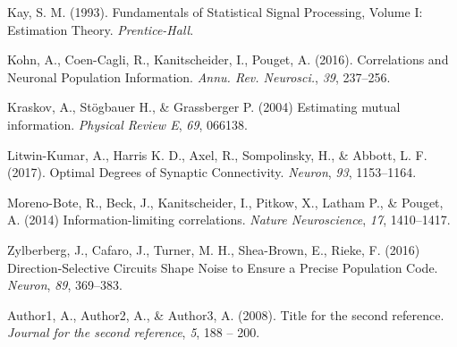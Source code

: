 \documentclass[12pt]{article}
\begin{document}
\begin{thebibliography}{100}
Kay, S. M. (1993).
\newblock Fundamentals of Statistical Signal Processing, Volume I: Estimation Theory.
\newblock \emph{Prentice-Hall}.

Kohn, A., Coen-Cagli, R., Kanitscheider, I., Pouget, A. (2016).
\newblock Correlations and Neuronal Population Information.
\newblock \emph{Annu. Rev. Neurosci.}, \emph{39}, 237--256.

Kraskov, A., St{\"o}gbauer H., \& Grassberger P. (2004)
\newblock Estimating mutual information.
\newblock \emph{Physical Review E},
\emph{69}, 066138.

Litwin-Kumar, A., Harris K. D., Axel, R., Sompolinsky, H., \& Abbott, L. F. (2017).
\newblock Optimal Degrees of Synaptic Connectivity.
\newblock \emph{Neuron}, \emph{93}, 1153--1164.

Moreno-Bote, R., Beck, J., Kanitscheider, I., Pitkow, X., Latham P., \& Pouget, A. (2014)
\newblock Information-limiting correlations.
\newblock \emph{Nature Neuroscience}, \emph{17}, 1410--1417.

Zylberberg, J., Cafaro, J., Turner, M. H., Shea-Brown, E., Rieke, F. (2016)
\newblock Direction-Selective Circuits Shape Noise to Ensure a Precise Population Code.
\newblock \emph{Neuron}, \emph{89}, 369--383.



Author1, A., Author2, A., \& Author3, A. (2008).
\newblock Title for the second reference.
\newblock \emph{Journal for the second reference}, \emph{5}, 188 -- 200.

\end{thebibliography}
\end{document}
